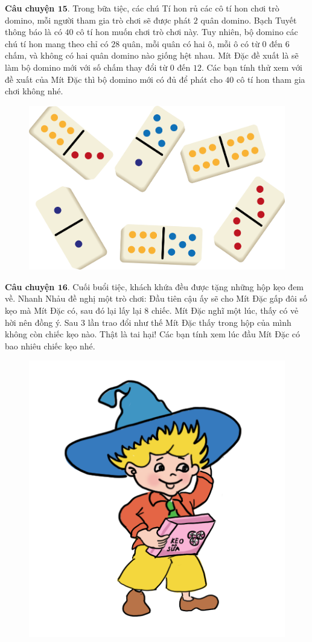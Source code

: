 	\textbf{\color{toancuabi}Câu chuyện $\pmb{15.}$} Trong bữa tiệc, các chú Tí hon rủ các cô tí hon chơi trò domino, mỗi người tham gia trò chơi sẽ được phát $2$ quân domino. Bạch Tuyết thông báo là có $40$ cô tí hon muốn chơi trò chơi này. Tuy nhiên, bộ domino các chú tí hon mang theo chỉ có $28$ quân, mỗi quân có hai ô, mỗi ô có từ $0$ đến $6$ chấm, và không có hai quân domino nào giống hệt nhau. Mít Đặc đề xuất là sẽ làm bộ domino mới với số chấm thay đổi từ $0$ đến $12$. Các bạn tính thử xem với đề xuất của Mít Đặc thì bộ domino mới có đủ để phát cho $40$ cô tí hon tham gia chơi không nhé.
	\begin{figure}[H]
		\centering
		\vspace*{-5pt}
		\captionsetup{labelformat= empty, justification=centering}
		\includegraphics[width=0.6\linewidth]{Hinh17_Domino}
		\vspace*{-10pt}
	\end{figure}
	\textbf{\color{toancuabi}Câu chuyện $\pmb{16.}$} Cuối buổi tiệc, khách khứa đều được tặng những hộp kẹo đem về. Nhanh Nhảu đề nghị một trò chơi: Đầu tiên cậu ấy sẽ cho Mít Đặc gấp đôi số kẹo mà Mít Đặc có, sau đó lại lấy lại $8$ chiếc. Mít Đặc nghĩ một lúc, thấy có vẻ hời nên đồng ý. Sau $3$ lần trao đổi như thế Mít Đặc thấy trong hộp của mình không còn chiếc kẹo nào. Thật là tai hại! Các bạn tính xem lúc đầu Mít Đặc có bao nhiêu chiếc kẹo nhé.
	\begin{figure}[H]
		\centering
		\vspace*{-5pt}
		\captionsetup{labelformat= empty, justification=centering}
		\includegraphics[width=0.3\linewidth]{Hinh18_MitDac}
		\vspace*{-10pt}
	\end{figure}
